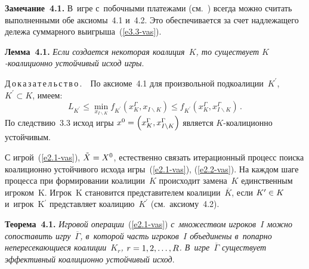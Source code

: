 \begin{multicols}{2}
    \noindent
    \textbf{Замечание~4.1.} В~игре с~побочными платежами (см.~\cite{1-vas})
всегда можно считать выполненными обе аксиомы~4.1 и~4.2. Это обеспечивается за счет
надлежащего дележа суммарного выигрыша~(\ref{e3.3-vas}).

    \smallskip

    \noindent
    \textbf{Лемма~4.1.} \textit{Если создается некоторая коалиция~$K$, то
существует \mbox{$K$-коа}\-ли\-ци\-он\-но устойчивый исход игры}.

    \noindent
    Д\,о\,к\,а\,з\,а\,т\,е\,л\,ь\,с\,т\,в\,о\,.\ \ По аксиоме~4.1 для произвольной
подкоалиции~$K^\prime$, $K^\prime\subset K$, имеем:
    $$
    L_{K^\prime}\leq \min\limits_{x_{ I\backslash K }}f_{K^\prime} \left(
x_K^\Gamma, x_{ I\backslash K} \right) \leq f_{K^\prime}\left( x_K^\Gamma, x^\Gamma_{
I\backslash K}\right)\,.
     $$
По следствию~3.3 исход игры $x^0\hm= \left( x_K^\Gamma, x^\Gamma_{I\backslash K}\right)$
является $K$-коа\-ли\-ци\-он\-но устойчивым.

    С игрой~(\ref{e2.1-vas}),  $\tilde{X}\hm= X^0$, естественно связать итерационный процесс
поиска коалиционно устойчивого исхода игры~(\ref{e2.1-vas}), (\ref{e2.2-vas}).
На каждом шаге процесса
при формировании коалиции~$K$ происходит замена~$K$ единственным
игроком~K. Игрок~K становится представителем коалиции~$\overline{K}$,
если $K^\prime \hm\in K$ и~игрок~K$^\prime$ представляет коалицию~$K^\prime$
(см.\ аксиому~4.2).

    \smallskip

    \noindent
    \textbf{Теорема~4.1.} \textit{Игровой операции}~(\ref{e2.1-vas}) \textit{с~множеством
игроков~$I$ можно сопоставить игру~$\overline{\Gamma}$, в~которой часть
игроков~$I$ объединены в~попарно непересекающиеся коалиции~$K_r$, $r\hm=
1,2,\ldots , R$. В~игре~$\overline{\Gamma}$ существует эффективный коалиционно
устойчивый исход}.

    \smallskip


\end{multicols}
